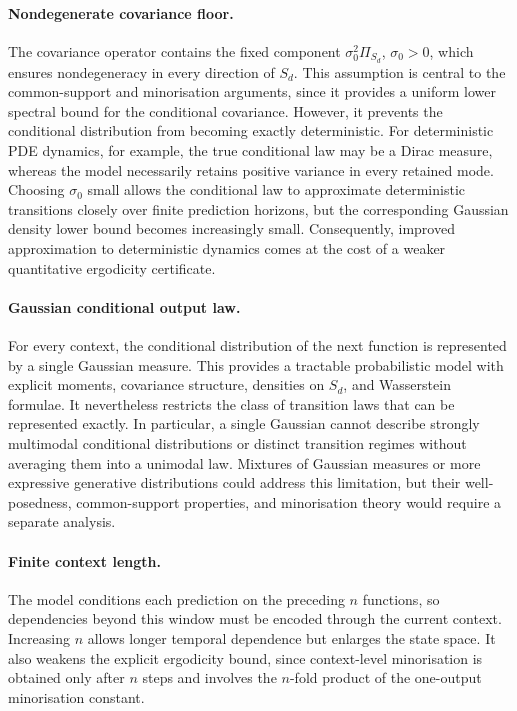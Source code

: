 \paragraph{Nondegenerate covariance floor.}
The covariance operator contains the fixed component
\(
\sigma_0^2\Pi_{S_d}\), \(\sigma_0>0\),
which ensures nondegeneracy in every direction of \(S_d\). This assumption is central to the common-support and minorisation arguments, since it provides a uniform lower spectral bound for the conditional covariance. However, it prevents the conditional distribution from becoming exactly deterministic. For deterministic PDE dynamics, for example, the true conditional law may be a Dirac measure, whereas the model necessarily retains positive variance in every retained mode. Choosing \(\sigma_0\) small allows the conditional law to approximate deterministic transitions closely over finite prediction horizons, but the corresponding Gaussian density lower bound becomes increasingly small. Consequently, improved approximation to deterministic dynamics comes at the cost of a weaker quantitative ergodicity certificate.

\paragraph{Gaussian conditional output law.}
For every context, the conditional distribution of the next function is represented by a single Gaussian measure. This provides a tractable probabilistic model with explicit moments, covariance structure, densities on \(S_d\), and Wasserstein formulae. It nevertheless restricts the class of transition laws that can be represented exactly. In particular, a single Gaussian cannot describe strongly multimodal conditional distributions or distinct transition regimes without averaging them into a unimodal law. Mixtures of Gaussian measures or more expressive generative distributions could address this limitation, but their well-posedness, common-support properties, and minorisation theory would require a separate analysis.

\paragraph{Finite context length.}
The model conditions each prediction on the preceding \(n\) functions, so dependencies beyond this window must be encoded through the current context. Increasing \(n\) allows longer temporal dependence but enlarges the state space. It also weakens the explicit ergodicity bound, since context-level minorisation is obtained only after \(n\) steps and involves the \(n\)-fold product of the one-output minorisation constant.

